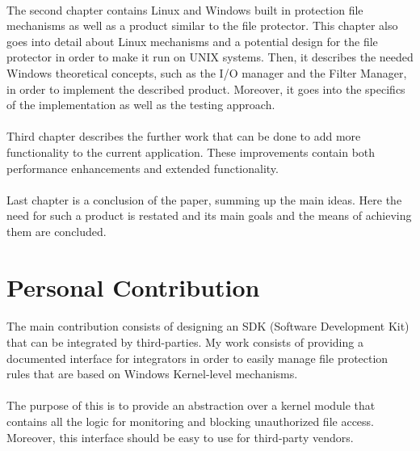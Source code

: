 	\paragraph{}
	The second chapter contains Linux and Windows built in protection file mechanisms as well as a product similar to the file protector. This chapter also goes into detail about Linux mechanisms and a potential design for the file protector in order to make it run on UNIX systems. Then, it describes the needed Windows theoretical concepts, such as the I/O manager and the Filter Manager, in order to implement the described product. Moreover, it goes into the specifics of the implementation as well as the testing approach. 
	
	\paragraph{}
	Third chapter describes the further work that can be done to add more functionality to the current application. These improvements contain both performance enhancements and extended functionality.  
	
	\paragraph{}
	Last chapter is a conclusion of the paper, summing up the main ideas. Here the need for such a product is restated and its main goals and the means of achieving them are concluded.
		
	\section{Personal Contribution}
	\paragraph{}
	The main contribution consists of designing an SDK (Software Development Kit) that can be integrated by third-parties. My work consists of providing a documented interface for integrators in order to easily manage file protection rules that are based on Windows Kernel-level mechanisms.
	
	\paragraph{}
	The purpose of this is to provide an abstraction over a kernel module that contains all the logic for monitoring and blocking unauthorized file access. Moreover, this interface should be easy to use for third-party vendors.
	
	